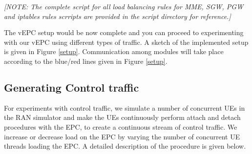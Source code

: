 \pdfminorversion=4\documentclass[hidelinks]{report}
\begin{document}
\textit{[NOTE: The complete script for all load balancing rules for MME, SGW, PGW and iptables rules scrripts are provided in the script directory for reference.]}

The vEPC setup would be now complete and you can proceed to experimenting with our vEPC using different types of traffic. A sketch of the implemented setup is given in Figure \ref{setup}. Communication among modules will take place according to the blue/red  lines given in Figure \ref{setup}.


\subsection*{Generating Control traffic}

For experiments with control traffic, we simulate a number of concurrent UEs in the RAN simulator and make the UEs continuously perform attach and detach procedures with the EPC, to create a continuous stream of control traffic. We increase or decrease load on the EPC by varying the number of concurrent UE threads loading the EPC. A detailed description of the procedure is given below.
\end{document}
